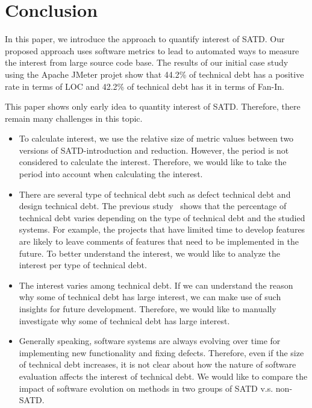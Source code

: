 \section{Conclusion} \label{conclusion}
%
In this paper, we introduce the approach to quantify interest of SATD. Our proposed approach uses
software metrics to lead to automated ways to measure the interest from large source code base. 
The results of our initial case study using the Apache JMeter projet
show that 44.2\% of technical debt has a positive rate in terms of LOC and 42.2\% of technical debt has it in terms of Fan-In.

 This paper shows only early idea to quantity interest of SATD. Therefore, there remain
many challenges in this topic. 

\begin{itemize}
\item To calculate interest, we use the relative size of metric values between two versions of SATD-introduction and reduction. However, the period is not considered to calculate the interest. Therefore, we would like to take the period into account when calculating the interest.
\item  There are several type of technical debt such as defect technical debt and design technical debt.
The previous study~\cite{Maldonado2015MTD} shows that the percentage of technical debt varies depending on the type of technical debt and the studied systems. For example, the projects that have limited time to develop features are likely to leave comments of features that need to be implemented in the future. 
To better understand the interest, we would like to analyze the interest per type of technical debt.
\item  The interest varies among technical debt. If we can understand the reason why some of technical debt has large interest, we can make use of such insights for future development. Therefore, we would like to manually investigate why some of technical debt has large interest.
\item Generally speaking, software systems are always evolving over time for implementing new functionality and fixing defects.
Therefore, even if the size of technical debt increases, it is not clear about how the nature of software evaluation affects the interest of technical debt.
We would like to compare the impact of software evolution on methods in two groups of SATD v.s. non-SATD.
\end{itemize}
